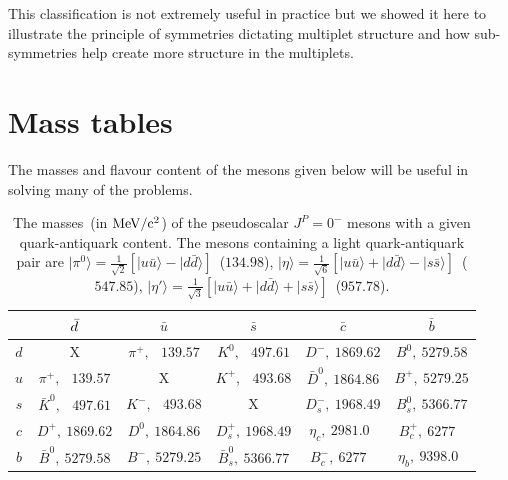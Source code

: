 \documentclass[12pt]{article}
\begin{document}
This classification is not extremely useful in practice but we showed it here to illustrate the principle of symmetries dictating multiplet structure and how sub-symmetries help create more structure in the multiplets.

\clearpage


 
\section{Mass tables}
The masses and flavour content of the mesons given below will be useful in solving many of the problems.
\begin{table}[h!!]
\begin{center}
\begin{tabular}{|c|c|c|c|c|c|}
\hline
 &$\bar d\rule{0cm}{0.4cm}$&$\bar u$&$\bar s$&$\bar c$&$\bar b$\\
\hline
$d$&X&$\pi^+,\ \phantom{0}139.57$&$K^0,\ \phantom{0}497.61$&$D^-,\ 1869.62$&$B^0,\ 5279.58$\\
$u$&$\pi^+,\ \phantom{0}139.57$ &X&$K^+,\ \phantom{0}493.68$&$\bar D^0,\ 1864.86$&$B^+,\ 5279.25$\\
$s$&$\bar K^0,\ \phantom{0}497.61$&$K^-,\ \phantom{0}493.68$&X&$D^-_s,\ 1968.49$&$B_s^0,\ 5366.77$\\
$c$&$D^+,\ 1869.62$&$D^0,\ 1864.86$&$D^+_s,\ 1968.49$&$\eta_c,\ 2981.0\phantom{0}$&$B_c^+,\ 6277\ \ \ $\\
$b$&$\bar B^0,\ 5279.58$&$B^-,\ 5279.25$&$\bar B_s^0,\ 5366.77$&$B_c^-,\ 6277\ \ \ $&$\eta_b,\ 9398.0\phantom{0}$\\
\hline
\end{tabular}
\end{center}
\caption{The masses~(in ${\rm MeV/c^2}$) of the pseudoscalar $J^P=0^-$ mesons with a given quark-antiquark content. The mesons containing a light quark-antiquark pair are 
\mbox{$|\pi^0\rangle=\frac1{\sqrt2}\left[|u\bar u\rangle-|d\bar d\rangle\right]$~($134.98$)}, 
\mbox{$|\eta\rangle=\frac1{\sqrt6}\left[|u\bar u\rangle+|d\bar d\rangle-|s\bar s\rangle\right]$~($547.85$)},
\mbox{$|\eta'\rangle=\frac1{\sqrt3}\left[|u\bar u\rangle+|d\bar d\rangle+|s\bar s\rangle\right]$~($957.78$)}. 
} 
\end{table}
\end{document}
